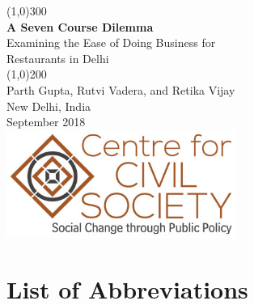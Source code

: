 \documentclass[a4paper, 12pt, twoside]{article}
\begin{document}
                    
 
\begin{titlepage}
\begin{center}
\line(1,0){300}\\
[0.25in]
\huge{\bfseries \textcolor{CCSbrown} {A Seven Course Dilemma}} \\
[0.5cm]
\large{Examining the Ease of Doing Business for \\ Restaurants in Delhi} \\
    	
\line(1,0){200}\\
[3in]
\LARGE{Parth Gupta, Rutvi Vadera, and Retika Vijay} \\ 
[1.5cm]
{\normalsize New Delhi, India} \\
{\normalsize September 2018} \\
[2cm]
\includegraphics[width = 75mm]{CCSlogo.jpg}

\end{center}
\end{titlepage}
                    
                 
                    \tableofcontents
                    
                    
                   \newpage
                   
                   \section*{List of Abbreviations}
                  
\end{document}
